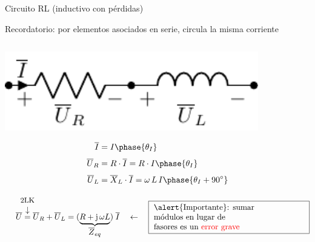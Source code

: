 \documentclass[aspectratio=169, usenames,svgnames,dvipsnames]{beamer}
\begin{document}

\begin{frame}{Circuito RL \hspace{3mm}(inductivo con pérdidas)}    

    \vspace{3mm}
    \alert{Recordatorio}: por elementos asociados en \alert{serie}, circula la \alert{misma corriente}

    \vspace{1mm}
    \begin{columns}
    \begin{column}{0.5\columnwidth}
    
        \vspace{-3mm}
        \begin{center}
            \hspace*{12mm}\includegraphics[width=0.83\textwidth]{../figs/RL.pdf}
        \end{center}

        \vspace{-8mm}
        \begin{align*}
            \overline{I} &=I\phase{\theta_I}\\[3pt]
            \overline{U}_R &= R \cdot \overline{I}=R\cdot I\phase{\theta_I}\\[3pt]
        	\overline{U}_L &=\overline{X}_L\cdot\overline{I}= \omega\,L\,I\phase{\theta_I+\ang{90}}
        \end{align*}

        \vspace{-8mm}
        \begin{equation*}
          \quad\; \overline{U} \overarrow[=][\downarrow]{\small 2LK} \overline{U}_R + \overline{U}_L =(\underbrace{R + \mathrm{j}\,\omega L}_{\textstyle \overline{Z}_{eq}} )\; \overline{I} 
          \quad \leftarrow \quad
            \boxed{\text{ \begin{minipage}{0.54\linewidth}\alert{Importante}: sumar\\ módulos en lugar de \\fasores es un \textcolor{red}{error grave} \end{minipage} } }
        \end{equation*}
    \end{column}    
        

\end{columns}
\end{frame}
\end{document}
